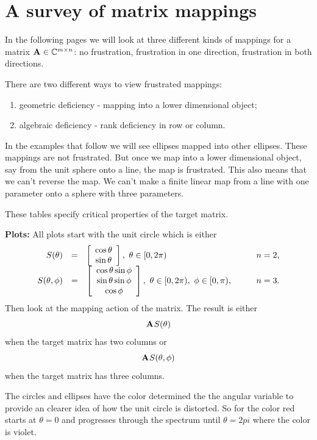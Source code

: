 \section{A survey of matrix mappings}
In the following pages we will look at three different kinds of mappings for a matrix $\textbf{A}^{\mathrm{}}\in\mathbb{C}^{m \times n}$: no frustration, frustration in one direction, frustration in both directions.

There are two different ways to view frustrated mappings:
\begin{enumerate}
\item geometric deficiency - mapping into a lower dimensional object;
\item algebraic deficiency - rank deficiency in row or column.
\end{enumerate}

In the examples that follow we will see ellipses mapped into other ellipses. These mappings are not frustrated. But once we map into a lower dimensional object, say from the unit sphere onto a line, the map is frustrated. This also means that we can't reverse the map. We can't make a finite linear map from a line with one parameter onto a sphere with three parameters.

These tables specify critical properties of the target matrix.

\textbf{Plots: }All plots start with the unit circle which is either
\begin{equation}
  \begin{array}{rcll}
     S(\theta) &=& \mat{c}{\cos \theta\\\sin \theta},\ \theta\in[0,2\pi) \qquad &n=2,\\
     S(\theta,\phi) &=& \mat{c}{\cos \theta\sin \phi\\\sin \theta \sin \phi\\\cos \phi},\ \theta\in[0,2\pi),\ \phi\in[0,\pi), \qquad &n=3.
  \end{array}
\end{equation}
Then look at the mapping action of the matrix. The result is either
\begin{equation}
  \textbf{A}^{\mathrm{}}S(\theta) 
\end{equation}
when the target matrix has two columns or
\begin{equation}
  \textbf{A}^{\mathrm{}}S(\theta,\phi) 
\end{equation}
when the target matrix has three columns.

The circles and ellipses have the color determined the the angular variable to provide an clearer idea of how the unit circle is distorted. So for the color red starts at $\theta=0$ and progresses through the spectrum until $\theta=2pi$ where the color is violet.\\

